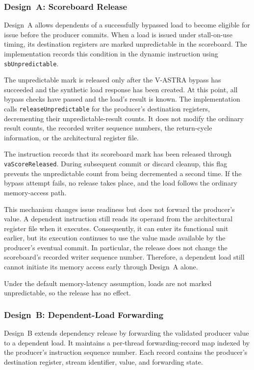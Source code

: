 \subsubsection{Design~A: Scoreboard Release}

Design~A allows dependents of a successfully bypassed load to
become eligible for issue before the producer commits. When a
load is issued under stall-on-use timing, its destination
registers are marked unpredictable in the scoreboard. The
implementation records this condition in the dynamic instruction
using \texttt{sbUnpredictable}.

The unpredictable mark is released only after the V-ASTRA bypass
has succeeded and the synthetic load response has been created.
At this point, all bypass checks have passed and the load's
result is known. The implementation calls
\texttt{releaseUnpredictable} for the producer's destination
registers, decrementing their unpredictable-result counts.
It does not modify the ordinary result counts, the recorded
writer sequence numbers, the return-cycle information, or the
architectural register file.

The instruction records that its scoreboard mark has been
released through \texttt{vaScore\allowbreak Released}. During subsequent
commit or discard cleanup, this flag prevents the unpredictable
count from being decremented a second time. If the bypass
attempt fails, no release takes place, and the load follows the
ordinary memory-access path.

This mechanism changes issue readiness but does not forward the
producer's value. A dependent instruction still reads its
operand from the architectural register file when it executes.
Consequently, it can enter its functional unit earlier, but its
execution continues to use the value made available by the
producer's eventual commit. In particular, the release does not
change the scoreboard's recorded writer sequence number.
Therefore, a dependent load still cannot initiate its memory
access early through Design~A alone.

Under the default memory-latency assumption, loads are not marked
unpredictable, so the release has no effect.

\subsubsection{Design~B: Dependent-Load Forwarding}

Design~B extends dependency release by forwarding the validated
producer value to a dependent load. It maintains a per-thread
forwarding-record map indexed by the producer's instruction
sequence number. Each record contains the producer's destination
register, stream identifier, value, and forwarding state.


